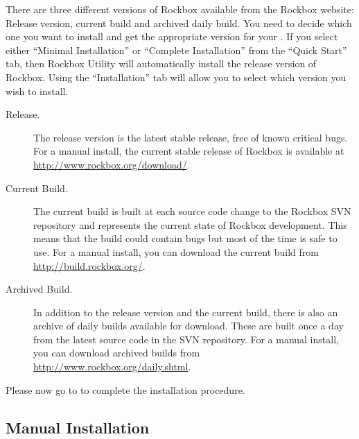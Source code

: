 There are three different versions of Rockbox available from the
Rockbox website:
\label{Version}
Release version, current build and archived daily build. You need to decide which one
you want to install and get the appropriate version for your \dap{}. If you
select either ``Minimal Installation'' or ``Complete Installation'' from the
``Quick Start'' tab, then Rockbox Utility will automatically install the
release version of Rockbox. Using the ``Installation'' tab will allow you
to select which version you wish to install.

\begin{description}

\item[Release.] The release version is the latest stable release, free
   of known critical bugs. For a manual install, the current stable release of Rockbox is
   available at \url{http://www.rockbox.org/download/}.
  
\item[Current Build.] The current build is built at each source code change to
  the Rockbox SVN repository and represents the current state of Rockbox
  development. This means that the build could contain bugs but most of
  the time is safe to use. For a manual install, you can download the current build from  
  \url{http://build.rockbox.org/}.

\item[Archived Build.] In addition to the release version and the current build,
  there is also an archive of daily builds available for download. These are
  built once a day from the latest source code in the SVN repository. For a manual install,
  you can download archived builds from \url{http://www.rockbox.org/daily.shtml}.

\end{description}


Please now go to  to complete the installation procedure.

\subsection{Manual Installation}

